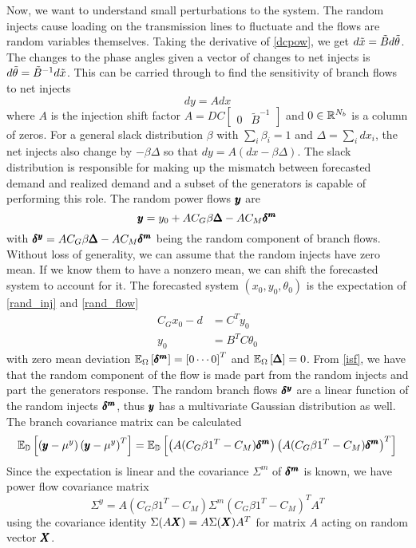 Now, we want to understand small perturbations to the system.
The random injects cause loading on the transmission lines to fluctuate and the flows are random variables themselves. Taking the derivative of \ref{dcpow}, we get $d \tilde{x} = \tilde{B} d \tilde{\theta} $.  The changes to the phase angles given a vector of changes to net injects is $ d \tilde{\theta} = \tilde{B}^{-1} d \tilde{x} $.  This can be carried through to find the sensitivity of branch flows to net injects 
\begin{equation}\label{isf}
 d y = A d x 
\end{equation}
where $A$ is the injection shift factor $A = D C \left[\begin{array}{cc} 0 & \tilde{B}^{-1} \end{array} \right]$ and $0\in \mathbb{R}^{N_b}$ is a column of zeros.  For a general slack distribution $\beta$ with $\sum_i \beta_i=1$ and $\Delta = \sum_i dx_i$, the net injects also change by $- \beta \Delta$ so that $dy = A\left( dx - \beta \Delta \right)$.  The slack distribution is responsible for making up the mismatch between forecasted demand and realized demand and a subset of the generators is capable of performing this role.  The random power flows $\pmb{y}$ are
\begin{equation}\label{rand_flow}
 \pmb{y} = y_0+ A C_G \beta \pmb{\Delta}  - A C_M \pmb{\delta^m} 
\end{equation}
with $\pmb{\delta^y} = A C_G \beta \pmb{\Delta} - AC_M \pmb{\delta^m}$ being the random component of branch flows.
Without loss of generality, we can assume that the random injects have zero mean.  If we know them to have a nonzero mean, we can shift the forecasted system to account for it. 
The forecasted system  $\left(x_0, y_0, \theta_0\right)$ is the expectation of \ref{rand_inj} and \ref{rand_flow}
\begin{align*}
C_G x_0 - d &= C^T y_0 \\
y_0 &= B^T C \theta_0 
\end{align*}
with zero mean deviation $\mathbb{E}_{\Omega} \left[ \pmb{\delta^m} \right]=\left[0 \cdots 0\right]^T$ and $\mathbb{E}_{\Omega} \left[ \pmb{\Delta} \right]=0$. 
From \ref{isf}, we have that the random component of the flow is made part from the random injects and part the generators response.   The random branch flows $\pmb{\delta^y}$ are a linear function of the random injects $\pmb{\delta^m}$, thus $\pmb{y}$ has a multivariate Gaussian distribution as well.  The branch covariance matrix can be calculated
\begin{equation*}
\mathbb{E}_{\mathbb{D}} \left[  \left( \pmb{y} - \mu^y \right) \left( \pmb{y} - \mu^y \right)^T  \right] = \mathbb{E}_{\mathbb{D}} \left[ \left( A(C_G\beta 1^T - C_M) \pmb{\delta^m} \right) \left( A(C_G\beta 1^T - C_M )\pmb{\delta^m} \right)^T  \right] 
\end{equation*}
Since the expectation is linear and the covariance $\Sigma^m$ of $\pmb{\delta^m}$ is known, we 
have power flow covariance matrix
\begin{equation}\label{branch_cov}
\Sigma^y = A(C_G\beta 1^T - C_M) \Sigma^m (C_G\beta 1^T - C_M)^T A^T
\end{equation}
using the covariance identity $\Sigma (A \pmb{X} ) = A \Sigma (\pmb{X}) A^T$ for matrix $A$ acting on random vector $\pmb{X}$.

